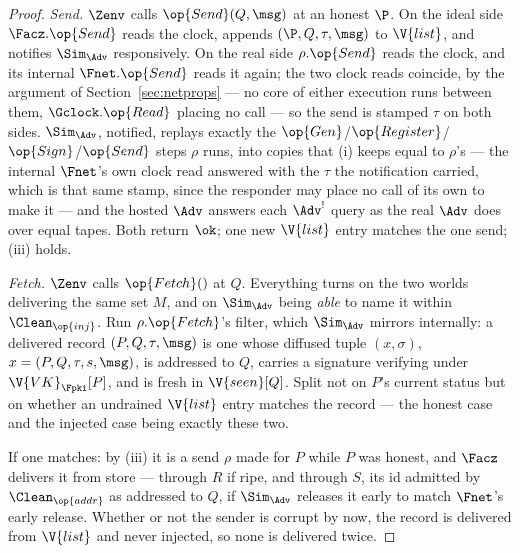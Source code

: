 \documentclass[10pt,oneside,openany]{book}
\theoremstyle{accentdef}
\theoremstyle{accentplain}
\begin{document}
\begin{proof}
\emph{Send.} $\Zenv$ calls $\op{Send}(Q,\msg)$ at an honest $\P$. On the ideal side
$\Facz.\op{Send}$ reads the clock, appends $(\P,Q,\tau,\msg)$ to $\V{list}$, and notifies
$\Sim_{\Adv}$ responsively. On the real side $\rho.\op{Send}$ reads the clock, and its internal
$\Fnet.\op{Send}$ reads it again; the two clock reads coincide, by the argument of
Section~\ref{sec:netprops} --- no core of either execution runs between them, $\Gclock.\op{Read}$
placing no call --- so the send is stamped $\tau$ on both sides. $\Sim_{\Adv}$, notified, replays
exactly the $\op{Gen}$/$\op{Register}$/$\op{Sign}$/$\op{Send}$ steps $\rho$ runs, into copies that
(i) keeps equal to $\rho$'s --- the internal $\Fnet$'s own clock read answered with the $\tau$ the
notification carried, which is that same stamp, since the responder may place no call of its own
to make it --- and the hosted $\Adv$ answers each $\Adv^{!}$ query as the real $\Adv$ does over
equal tapes. Both return $\ok$; one new $\V{list}$ entry matches the one send; (iii) holds.

\emph{Fetch.} $\Zenv$ calls $\op{Fetch}()$ at $Q$. Everything turns on the two worlds delivering
the same set $M$, and on $\Sim_{\Adv}$ being \emph{able} to name it within $\Clean_{\op{inj}}$.
Run $\rho.\op{Fetch}$'s filter, which $\Sim_{\Adv}$ mirrors internally: a delivered record
$(P,Q,\tau,\msg)$ is one whose diffused tuple $(x,\sigma)$, $x = (P,Q,\tau,s,\msg)$, is addressed
to $Q$, carries a signature verifying under $\V{VK}_{\Fpki}[P]$, and is fresh in $\V{seen}[Q]$.
Split not on $P$'s current status but on whether an undrained $\V{list}$ entry matches the
record --- the honest case and the injected case being exactly these two.

If one matches: by (iii) it is a send $\rho$ made for $P$ while $P$ was honest, and $\Facz$
delivers it from store --- through $R$ if ripe, and through $S$, its id admitted by
$\Clean_{\op{addr}}$ as addressed to $Q$, if $\Sim_{\Adv}$ releases it early to match $\Fnet$'s
early release. Whether or not the sender is corrupt by now, the record is delivered from
$\V{list}$ and never injected, so none is delivered twice.


\end{proof}
\end{document}
